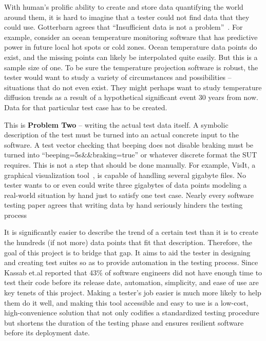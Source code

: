 With human's prolific ability to create and store data quantifying the world around them, it is hard to imagine that a tester could not find data that they could use. Gotterbarn agrees that ``Insufficient data is not a problem''~\cite{Gotterbarn:2016:CFC:2874239.2874248}. For example, consider an ocean temperature monitoring software that has predictive power in future local hot spots or cold zones. Ocean temperature data points do exist, and the missing points can likely be interpolated quite easily. But this is a sample size of one. To be sure the temperature projection software is robust, the tester would want to study a variety of circumstances and possibilities – situations that do not even exist. They might perhaps want to study temperature diffusion trends as a result of a hypothetical significant event 30 years from now. Data for that particular test case has to be created.

This is \textbf{Problem Two} -- writing the actual test data itself. A symbolic description of the test must be turned into an actual concrete input to the software. A test vector checking that beeping does not disable braking must be turned into ``beeping=5s\&\&braking=true'' or whatever discrete format the SUT requires. This is not a step that should be done manually. For example, VisIt, a graphical visualization tool~\cite{VisIt}, is capable of handling several gigabyte files. No tester wants to or even could write three gigabytes of data points modeling a real-world situation by hand just to satisfy one test case. Nearly every software testing paper agrees that writing data by hand seriously hinders the testing process~\cite{Misailovic:2007:PTG:1287624.1287645,Murphy:2007:PRT:1292414.1292425,Palka:2011:TOC:1982595.1982615,Patrick:2016:ATI:2970276.2970333}

It is significantly easier to describe the trend of a certain test than it is to create the hundreds (if not more) data points that fit that description. Therefore, the goal of this project is to bridge that gap. It aims to aid the tester in designing and creating test suites so as to provide automation in the testing process. Since Kassab et.al reported that 43\% of software engineers did not have enough time to test their code before its release date, automation, simplicity, and ease of use are key tenets of this project. Making a tester's job easier is much more likely to help them do it well, and making this tool accessible and easy to use is a low-cost, high-convenience solution that not only codifies a standardized testing procedure but shortens the duration of the testing phase and ensures resilient software before its deployment date. 